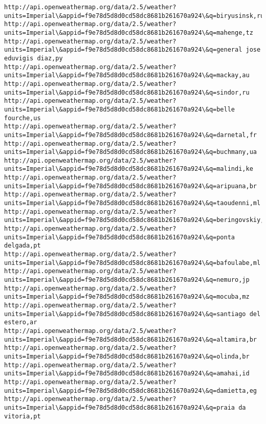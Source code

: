 \documentclass[11pt]{article}
\begin{document}
\begin{Verbatim}[commandchars=\\\{\}]
http://api.openweathermap.org/data/2.5/weather?units=Imperial\&appid=f9e78d5d8d0cd58dc8681b261670a924\&q=biryusinsk,ru
http://api.openweathermap.org/data/2.5/weather?units=Imperial\&appid=f9e78d5d8d0cd58dc8681b261670a924\&q=mahenge,tz
http://api.openweathermap.org/data/2.5/weather?units=Imperial\&appid=f9e78d5d8d0cd58dc8681b261670a924\&q=general jose eduvigis diaz,py
http://api.openweathermap.org/data/2.5/weather?units=Imperial\&appid=f9e78d5d8d0cd58dc8681b261670a924\&q=mackay,au
http://api.openweathermap.org/data/2.5/weather?units=Imperial\&appid=f9e78d5d8d0cd58dc8681b261670a924\&q=sindor,ru
http://api.openweathermap.org/data/2.5/weather?units=Imperial\&appid=f9e78d5d8d0cd58dc8681b261670a924\&q=belle fourche,us
http://api.openweathermap.org/data/2.5/weather?units=Imperial\&appid=f9e78d5d8d0cd58dc8681b261670a924\&q=darnetal,fr
http://api.openweathermap.org/data/2.5/weather?units=Imperial\&appid=f9e78d5d8d0cd58dc8681b261670a924\&q=buchmany,ua
http://api.openweathermap.org/data/2.5/weather?units=Imperial\&appid=f9e78d5d8d0cd58dc8681b261670a924\&q=malindi,ke
http://api.openweathermap.org/data/2.5/weather?units=Imperial\&appid=f9e78d5d8d0cd58dc8681b261670a924\&q=aripuana,br
http://api.openweathermap.org/data/2.5/weather?units=Imperial\&appid=f9e78d5d8d0cd58dc8681b261670a924\&q=taoudenni,ml
http://api.openweathermap.org/data/2.5/weather?units=Imperial\&appid=f9e78d5d8d0cd58dc8681b261670a924\&q=beringovskiy,ru
http://api.openweathermap.org/data/2.5/weather?units=Imperial\&appid=f9e78d5d8d0cd58dc8681b261670a924\&q=ponta delgada,pt
http://api.openweathermap.org/data/2.5/weather?units=Imperial\&appid=f9e78d5d8d0cd58dc8681b261670a924\&q=bafoulabe,ml
http://api.openweathermap.org/data/2.5/weather?units=Imperial\&appid=f9e78d5d8d0cd58dc8681b261670a924\&q=nemuro,jp
http://api.openweathermap.org/data/2.5/weather?units=Imperial\&appid=f9e78d5d8d0cd58dc8681b261670a924\&q=mocuba,mz
http://api.openweathermap.org/data/2.5/weather?units=Imperial\&appid=f9e78d5d8d0cd58dc8681b261670a924\&q=santiago del estero,ar
http://api.openweathermap.org/data/2.5/weather?units=Imperial\&appid=f9e78d5d8d0cd58dc8681b261670a924\&q=altamira,br
http://api.openweathermap.org/data/2.5/weather?units=Imperial\&appid=f9e78d5d8d0cd58dc8681b261670a924\&q=olinda,br
http://api.openweathermap.org/data/2.5/weather?units=Imperial\&appid=f9e78d5d8d0cd58dc8681b261670a924\&q=amahai,id
http://api.openweathermap.org/data/2.5/weather?units=Imperial\&appid=f9e78d5d8d0cd58dc8681b261670a924\&q=damietta,eg
http://api.openweathermap.org/data/2.5/weather?units=Imperial\&appid=f9e78d5d8d0cd58dc8681b261670a924\&q=praia da vitoria,pt

\end{Verbatim}
\end{document}
